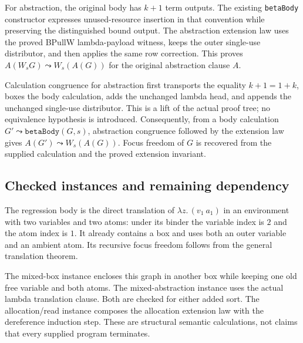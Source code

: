 For abstraction, the original body has $k+1$ term outputs. The existing
\texttt{betaBody} constructor expresses unused-resource insertion in that
convention while preserving the distinguished bound output. The abstraction
extension law uses the proved BPullW lambda-payload witness, keeps the outer
single-use distributor, and then applies the same row correction. This
proves $A(W_sG)\leadsto W_s(A(G))$ for the original abstraction clause $A$.

Calculation congruence for abstraction first transports the equality
$k+1=1+k$, boxes the body calculation, adds the unchanged lambda head,
and appends the unchanged single-use distributor. This is a lift of the
actual proof tree; no equivalence hypothesis is introduced. Consequently,
from a body calculation $G'\leadsto\mathtt{betaBody}(G,s)$, abstraction
congruence followed by the extension law gives
$A(G')\leadsto W_s(A(G))$. Focus freedom of $G$ is recovered from the
supplied calculation and the proved extension invariant.

\subsection{Checked instances and remaining dependency}
The regression body is the direct translation of $\lambda z.\,(v_1\ a_1)$
in an environment with two variables and two atoms: under its binder the
variable index is $2$ and the atom index is $1$. It already contains a box
and uses both an outer variable and an ambient atom. Its recursive focus
freedom follows from the general translation theorem.

The mixed-box instance encloses this graph in another box while keeping one
old free variable and both atoms. The mixed-abstraction instance uses the
actual lambda translation clause. Both are checked for either added sort.
The allocation/read instance composes the allocation extension law with
the dereference induction step. These are structural semantic calculations,
not claims that every supplied program terminates.

